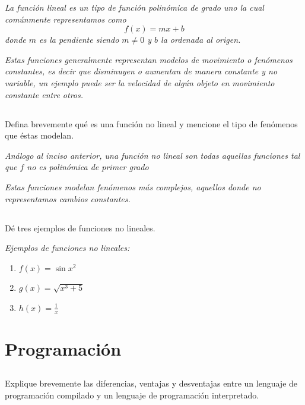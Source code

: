 \documentclass[12pt,oneside]{book}
\begin{document}
\textit{La función lineal es un tipo de función polinómica de grado uno la cual comúnmente representamos como}
\begin{equation*}
    f(x)=mx+b
\end{equation*}
\textit{donde $m$ es la pendiente siendo $m \neq 0$ y $b$ la ordenada al origen.}

\textit{Estas funciones generalmente representan modelos de movimiento o fenómenos constantes, es decir que disminuyen o aumentan de manera constante y no variable, un ejemplo puede ser la velocidad de algún objeto en movimiento constante entre otros.}

\section[Ejercicio]{}
{\large Defina brevemente qué es una función no lineal y mencione el tipo de fenómenos que éstas modelan.}

\textit{Análogo al inciso anterior, una función no lineal son todas aquellas funciones tal que $f$ no es polinómica de primer grado}

\textit{Estas funciones modelan fenómenos más complejos, aquellos donde no representamos cambios constantes.}

\section[Ejercicio]{}
{\large  Dé tres ejemplos de funciones no lineales.}

\textit{Ejemplos de funciones no lineales:}

\begin{enumerate}
    \item $f(x) = \sin{x^2}$
    \item $g(x) = \sqrt{x^3+5}$
    \item $h(x) = \frac{1}{x}$
\end{enumerate}

\chapter{Programación}

\section[Ejercicio]{}
{\large Explique brevemente las diferencias, ventajas y desventajas entre un lenguaje de programación compilado y un lenguaje de programación interpretado.}
\end{document}
